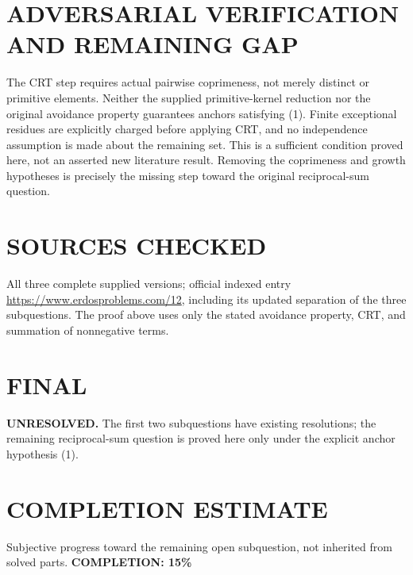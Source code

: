 \section{ADVERSARIAL VERIFICATION AND REMAINING GAP}
The CRT step requires actual pairwise coprimeness, not merely distinct or primitive elements. Neither the supplied primitive-kernel reduction nor the original avoidance property guarantees anchors satisfying (1). Finite exceptional residues are explicitly charged before applying CRT, and no independence assumption is made about the remaining set. This is a sufficient condition proved here, not an asserted new literature result. Removing the coprimeness and growth hypotheses is precisely the missing step toward the original reciprocal-sum question.
\section{SOURCES CHECKED}
All three complete supplied versions; official indexed entry \url{https://www.erdosproblems.com/12}, including its updated separation of the three subquestions. The proof above uses only the stated avoidance property, CRT, and summation of nonnegative terms.
\section{FINAL}
\textbf{UNRESOLVED.} The first two subquestions have existing resolutions; the remaining reciprocal-sum question is proved here only under the explicit anchor hypothesis (1).
\section{COMPLETION ESTIMATE}
Subjective progress toward the remaining open subquestion, not inherited from solved parts.
\textbf{COMPLETION: 15\%}
